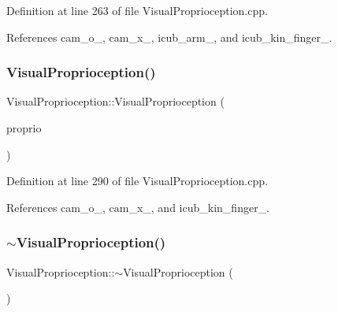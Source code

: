 Definition at line 263 of file Visual\+Proprioception.\+cpp.



References cam\+\_\+o\+\_\+, cam\+\_\+x\+\_\+, icub\+\_\+arm\+\_\+, and icub\+\_\+kin\+\_\+finger\+\_\+.

\mbox{\label{classVisualProprioception_a64d833138ea6dda6e893693df8768ba9}} 
\subsubsection{\texorpdfstring{Visual\+Proprioception()}{VisualProprioception()}\hspace{0.1cm}{\footnotesize\ttfamily [3/3]}}
{\footnotesize\ttfamily Visual\+Proprioception\+::\+Visual\+Proprioception (\begin{DoxyParamCaption}\item[{\hyperlink{classVisualProprioception}{Visual\+Proprioception} \&\&}]{proprio }\end{DoxyParamCaption})\hspace{0.3cm}{\ttfamily [noexcept]}}



Definition at line 290 of file Visual\+Proprioception.\+cpp.



References cam\+\_\+o\+\_\+, cam\+\_\+x\+\_\+, and icub\+\_\+kin\+\_\+finger\+\_\+.

\mbox{\label{classVisualProprioception_a7c108406fb3ab7e381b15f8e06325513}} 
\subsubsection{\texorpdfstring{$\sim$\+Visual\+Proprioception()}{~VisualProprioception()}}
{\footnotesize\ttfamily Visual\+Proprioception\+::$\sim$\+Visual\+Proprioception (\begin{DoxyParamCaption}{ }\end{DoxyParamCaption})\hspace{0.3cm}{\ttfamily [noexcept]}}



